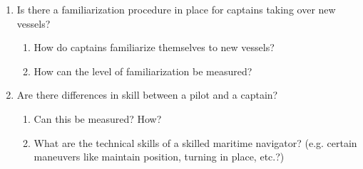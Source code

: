 \begin{enumerate}
	\item Is there a familiarization procedure in place for captains taking over new vessels? 
	\begin{enumerate}
		\item How do captains familiarize themselves to new vessels? 
		\item How can the level of familiarization be measured?
	\end{enumerate}

	\item Are there differences in skill between a pilot and a captain?
	\begin{enumerate}
		\item Can this be measured? How?
		\item What are the technical skills of a skilled maritime navigator? (e.g. certain maneuvers like maintain position, turning in place, etc.?)
	\end{enumerate}
\end{enumerate}
